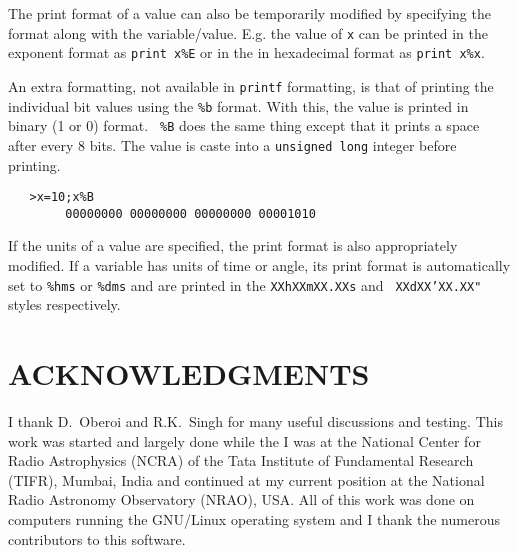 \documentclass[11pt]{article}
\begin{document}
The print format of a value can also be temporarily modified by
specifying the format along with the variable/value.  E.g. the value
of {\tt x} can be printed in the exponent format as {\tt print x\%E}
or in the in hexadecimal format as {\tt print x\%x}.

An extra formatting, not available in {\tt printf} formatting, is that
of printing the individual bit values using the {\tt \%b} format.
With this, the value is printed in binary (1 or 0) format.  {\tt
\%B} does the same thing except that it prints a space after every 8 bits.
The value is caste into a {\tt unsigned long} integer before
printing.
\begin{verbatim}
   >x=10;x%B
        00000000 00000000 00000000 00001010
\end{verbatim}
If the units of a value are specified, the print format is also
appropriately modified.  If a variable has units of time or angle, its
print format is automatically set to {\tt \%hms} or {\tt \%dms}
and are printed in the {\tt XXhXXmXX.XXs} and {\tt
XXdXX{\texttt{'}}XX.XX{\texttt{"}}} styles respectively.

\section{ACKNOWLEDGMENTS}
I thank D.~Oberoi and R.K.~Singh for many useful discussions and testing.  This work was
started and largely done while the I was at the National Center for Radio
Astrophysics (NCRA) of the Tata Institute of Fundamental Research (TIFR), Mumbai,
India and continued at my current position at the National Radio Astronomy Observatory
(NRAO), USA.  All of this work was done on computers running the GNU/Linux
operating system and I thank the numerous contributors to this software.
\end{document}
